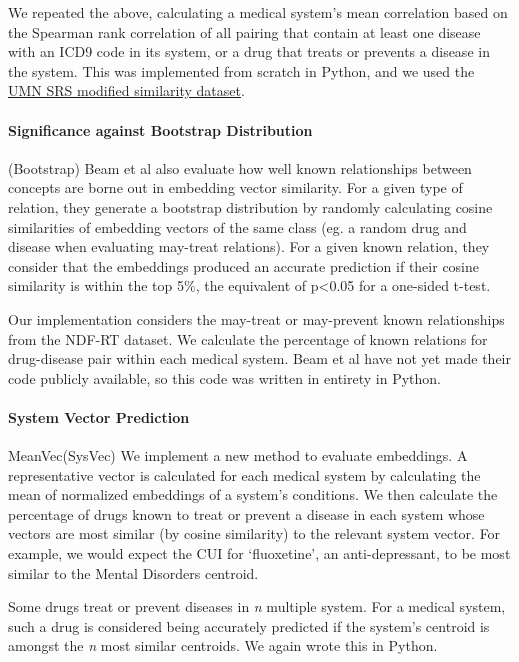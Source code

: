 \documentclass[10pt]{article}
\begin{document}
We repeated the above, calculating a medical system's mean correlation based on the Spearman rank correlation of all pairing that contain at least one disease with an ICD9 code in its system, or a drug that treats or prevents a disease in the system. This was implemented from scratch in Python, and we used the \href{https://conservancy.umn.edu/handle/11299/196265}{UMN SRS modified similarity dataset}.

\paragraph{Significance against Bootstrap Distribution}(Bootstrap)
Beam et al  also evaluate how well known relationships between concepts are borne out in embedding vector similarity. For a given type of relation, they generate a bootstrap distribution by randomly calculating cosine similarities of embedding vectors of the same class (eg. a random drug and disease when evaluating  may-treat relations). For a given known relation, they consider that the embeddings produced an accurate prediction if their cosine similarity is within the top 5\%, the equivalent of p<0.05 for a one-sided t-test. 

Our implementation considers the may-treat or may-prevent known relationships from the NDF-RT dataset. We calculate the percentage of known relations for drug-disease pair within each medical system. Beam et al have not yet made their code publicly available, so this code was written in entirety in Python. 

\paragraph{System Vector Prediction}{MeanVec}(SysVec)
We implement a new method to evaluate embeddings. A representative vector is calculated for each medical system by calculating the mean of normalized embeddings of a system's conditions. We then calculate the percentage of drugs known to treat or prevent a disease in each system whose vectors are most similar (by cosine similarity) to the relevant system vector. For example, we would expect the CUI for `fluoxetine', an anti-depressant, to be most similar to the Mental Disorders centroid. 

Some drugs treat or prevent diseases in \emph{n} multiple system. For a medical system, such a drug is considered being accurately predicted if the system's centroid is amongst the \emph{n} most similar centroids. We again wrote this in Python. 
\end{document}

